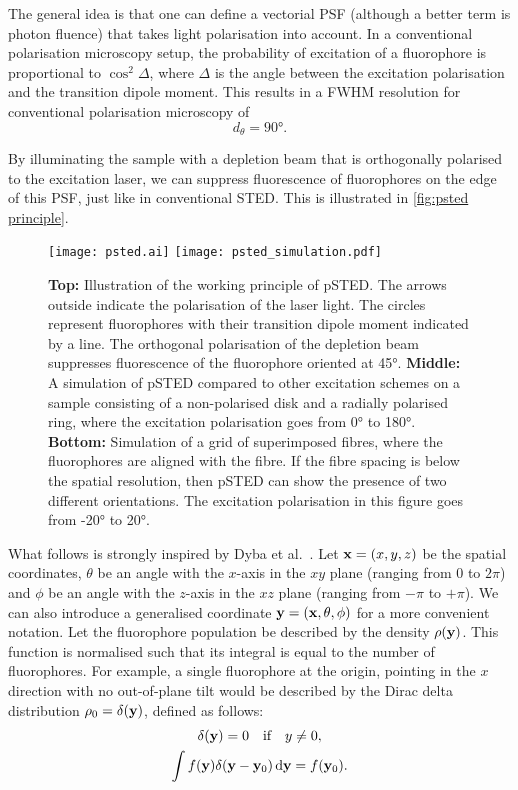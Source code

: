 The general idea is that one can define a vectorial PSF (although a better term is photon fluence) that takes light polarisation into account. In a conventional polarisation microscopy setup, the probability of excitation of a fluorophore is proportional to $ \cos^2 \Delta $, where $ \Delta $ is the angle between the excitation polarisation and the transition dipole moment. This results in a FWHM resolution for conventional polarisation microscopy of 
\begin{equation}
	d_\theta = \ang{90}.
\end{equation}

By illuminating the sample with a depletion beam that is orthogonally polarised to the excitation laser, we can suppress fluorescence of fluorophores on the edge of this PSF, just like in conventional STED. This is illustrated in \autoref{fig:psted principle}.

\begin{figure}
	\centering
	\texttt{[image: psted.ai]}
	\texttt{[image: psted\_simulation.pdf]}
	\caption{
		\textbf{Top:} Illustration of the working principle of pSTED. The arrows outside indicate the polarisation of the laser light. The circles represent fluorophores with their transition dipole moment indicated by a line. The orthogonal polarisation of the depletion beam suppresses fluorescence of the fluorophore oriented at \ang{45}.
		\textbf{Middle:} A simulation of pSTED compared to other excitation schemes on a sample consisting of a non-polarised disk and a radially polarised ring, where the excitation polarisation goes from \ang{0} to \ang{180}.
		\textbf{Bottom:} Simulation of a grid of superimposed fibres, where the fluorophores are aligned with the fibre. If the fibre spacing is below the spatial resolution, then pSTED can show the presence of two different orientations. The excitation polarisation in this figure goes from \ang{-20} to \ang{+20}.
	}
	\label{fig:psted principle}
\end{figure}

What follows is strongly inspired by Dyba et al.~\cite{Dyba2005}. Let $ \vb{x} = (x, y, z)$ be the spatial coordinates, $ \theta $ be an angle with the $ x $-axis in the $ xy $ plane (ranging from $ 0 $ to $ 2\pi$) and $ \phi $ be an angle with the $ z $-axis in the $ xz $ plane (ranging from $ -\pi $ to $+\pi$). We can also introduce a generalised coordinate $ \vb{y} = (\vb{x}, \theta, \phi) $ for a more convenient notation.
Let the fluorophore population be described by the density $ \rho(\vb{y}) $. This function is normalised such that its integral is equal to the number of fluorophores. For example, a single fluorophore at the origin, pointing in the $ x $ direction with no out-of-plane tilt would be described by the Dirac delta distribution $ \rho_0 = \delta(\vb{y}) $, defined as follows:
\begin{gather}
	\delta(\vb{y}) = 0 \qq{if} y\neq0, \\
	\int f(\vb{y})\delta(\vb{y}-\vb{y}_0) \dd{\vb{y}} = f(\vb{y}_0).
\end{gather}

